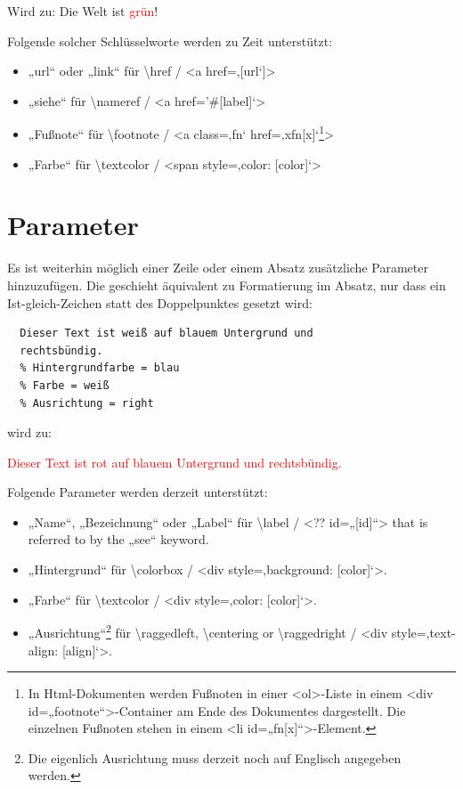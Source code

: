 \documentclass{scrartcl}
\begin{document}
{Wird zu:
Die Welt ist \textcolor{red}{grün}!\\}

{Folgende solcher Schlüsselworte werden zu Zeit unterstützt:\\}

\begin{itemize}
\item „url“ oder „link“ für \textbackslash href / <a href=‚{[url‘]}>
\item „siehe“ für \textbackslash nameref / <a href='\#{[label]}‘> 
\item „Fußnote“ für  \textbackslash footnote / <a class=‚fn‘ href=‚xfn{[x]}‘\footnote{In Html-Dokumenten werden Fußnoten in einer <ol>-Liste in einem <div id=„footnote“>-Container am Ende des Dokumentes dargestellt. Die einzelnen Fußnoten stehen in einem <li id=„fn{[x]}“>-Element.}\xspace >
\item „Farbe“ für \textbackslash textcolor / <span style=‚color: {[color]}‘>
\end{itemize}


\section{Parameter}

{Es ist weiterhin möglich einer Zeile oder einem Absatz
zusätzliche Parameter hinzuzufügen. Die geschieht äquivalent
zu Formatierung im Absatz, nur dass ein Ist-gleich-Zeichen
statt des Doppelpunktes gesetzt wird:\\}

\begin{verbatim}
  Dieser Text ist weiß auf blauem Untergrund und
  rechtsbündig.
  % Hintergrundfarbe = blau
  % Farbe = weiß
  % Ausrichtung = right
\end{verbatim}


{wird zu:\\}

\colorbox{PaleTurquoise1}{\parbox{\linewidth}{%
{\raggedleft%
\textcolor{red}{%
Dieser Text ist rot auf blauem Untergrund und
rechtsbündig.}\\}
}
}

{Folgende Parameter werden derzeit unterstützt:\\}

\begin{itemize}
\item „Name“, „Bezeichnung“ oder  „Label“ für \textbackslash label / <?? id=„{[id]}“> that is
  referred to by the „see“ keyword.
\item „Hintergrund“ für \textbackslash colorbox / <div style=‚background: {[color]}‘>.
\item „Farbe“ für \textbackslash textcolor / <div style=‚color: {[color]}‘>.
\item „Ausrichtung“\footnote{Die eigenlich Ausrichtung muss derzeit noch auf Englisch angegeben werden.}\xspace  für \textbackslash raggedleft, \textbackslash centering or \textbackslash raggedright / <div
  style=‚text-align: {[align]}‘>.
\end{itemize}
\end{document}

